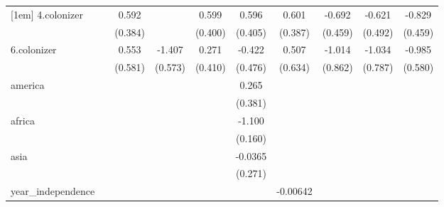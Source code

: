 {\begin{tabular}{l*{9}{c}}
[1em]
4.colonizer &                     &       0.592         &                     &       0.599         &       0.596         &       0.601         &      -0.692         &      -0.621         &      -0.829\sym{*}  \\
            &                     &     (0.384)         &                     &     (0.400)         &     (0.405)         &     (0.387)         &     (0.459)         &     (0.492)         &     (0.459)         \\
[1em]
6.colonizer &                     &       0.553         &      -1.407\sym{**} &       0.271         &      -0.422         &       0.507         &      -1.014         &      -1.034         &      -0.985\sym{*}  \\
            &                     &     (0.581)         &     (0.573)         &     (0.410)         &     (0.476)         &     (0.634)         &     (0.862)         &     (0.787)         &     (0.580)         \\
[1em]
america     &                     &                     &                     &                     &       0.265         &                     &                     &                     &                     \\
            &                     &                     &                     &                     &     (0.381)         &                     &                     &                     &                     \\
[1em]
africa      &                     &                     &                     &                     &      -1.100\sym{***}&                     &                     &                     &                     \\
            &                     &                     &                     &                     &     (0.160)         &                     &                     &                     &                     \\
[1em]
asia        &                     &                     &                     &                     &     -0.0365         &                     &                     &                     &                     \\
            &                     &                     &                     &                     &     (0.271)         &                     &                     &                     &                     \\
[1em]
year\_independence&                     &                     &                     &                     &                     &    -0.00642         &                     &                     &                     \\

\end{tabular}}

